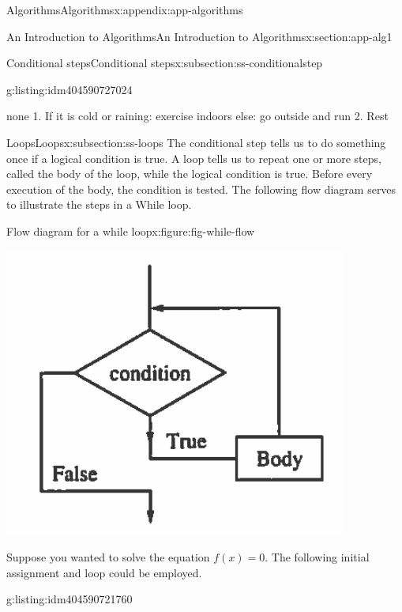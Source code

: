 \documentclass[twoside,10pt,]{book}
\numberwithin{equation}{section}
\begin{document}
\begin{appendixptx}{Algorithms}{}{Algorithms}{}{}{x:appendix:app-algorithms}
\begin{sectionptx}{An Introduction to Algorithms}{}{An Introduction to Algorithms}{}{}{x:section:app-alg1}
\begin{subsectionptx}{Conditional steps}{}{Conditional steps}{}{}{x:subsection:ss-conditionalstep}
\begin{listingptx}{}{g:listing:idm404590727024}{}%
\begin{program}{none}
1. If it is cold or raining:
		exercise indoors
	else: 
		go outside and run
2. Rest
\end{program}
\tcblower
\end{listingptx}%
\end{subsectionptx}
%
%
\typeout{************************************************}
\typeout{************************************************}
%
\begin{subsectionptx}{Loops}{}{Loops}{}{}{x:subsection:ss-loops}
The conditional step tells us to do something once if a logical condition is true. A  loop tells us to repeat one or more steps, called the body of the loop, while the logical condition is true. Before every execution of the body, the condition is tested. The following flow diagram serves to illustrate the steps in a While loop.%
\begin{figureptx}{Flow diagram for a while loop}{x:figure:fig-while-flow}{}%
\begin{image}{0}{1}{0}%
\includegraphics[width=\linewidth]{images/while-flow.png}
\end{image}%
\tcblower
\end{figureptx}%
Suppose you wanted to solve the equation \(f(x) = 0\). The following initial assignment and loop could be employed.%
\begin{listingptx}{}{g:listing:idm404590721760}{}%

\end{listingptx}
\end{subsectionptx}
\end{sectionptx}
\end{appendixptx}
\end{document}
